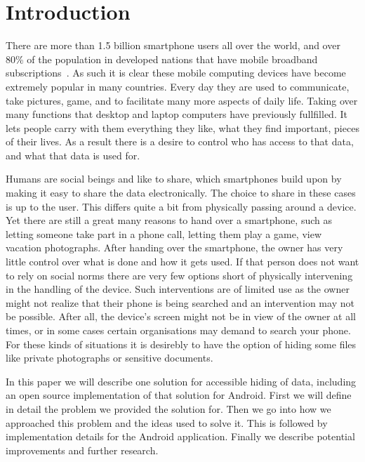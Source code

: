 \section{Introduction}
\label{sec:introduction}
There are more than 1.5 billion smartphone users all over the world\cite{smartphoneusage}, and over 80\% of the population in developed nations that have mobile broadband subscriptions~\cite{mobilebroadband}.
As such it is clear these mobile computing devices have become extremely popular in many countries.
Every day they are used to communicate, take pictures, game, and to facilitate many more aspects of daily life.
Taking over many functions that desktop and laptop computers have previously fullfilled.
It lets people carry with them everything they like, what they find important, pieces of their lives.
As a result there is a desire to control who has access to that data, and what that data is used for.

Humans are social beings and like to share, which smartphones build upon by making it easy to share the data electronically.
The choice to share in these cases is up to the user. 
This differs quite a bit from physically passing around a device.
Yet there are still a great many reasons to hand over a smartphone, such as letting someone take part in a phone call, letting them play a game, view vacation photographs.
After handing over the smartphone, the owner has very little control over what is done and how it gets used.
If that person does not want to rely on social norms there are very few options short of physically intervening in the handling of the device.
Such interventions are of limited use as the owner might not realize that their phone is being searched and an intervention may not be possible.
After all, the device's screen might not be in view of the owner at all times, or in some cases certain organisations may demand to search your phone.
For these kinds of situations it is desirebly to have the option of hiding some files like private photographs or sensitive documents.


In this paper we will describe one solution for accessible hiding of data, including an open source implementation of that solution for Android.
First we will define in detail the problem we provided the solution for.
Then we go into how we approached this problem and the ideas used to solve it.
This is followed by implementation details for the Android application.
Finally we describe potential improvements and further research.